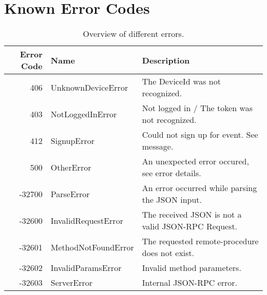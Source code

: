 \documentclass[a4paper]{scrreprt}
\begin{document}
\section{Known Error Codes}
\begin{table}[hb]
\centering
\begin{tabular}{| r | l | l |}
\hline
\textbf{Error Code} & \textbf{Name} & \textbf{Description} \\
\hline
406 & UnknownDeviceError & The DeviceId was not recognized.\\
403 & NotLoggedInError & Not logged in / The token was not recognized.\\
412 & SignupError & Could not sign up for event. See message.\\
\hline
500 & OtherError &An unexpected error occured, see error details. \\
-32700 & ParseError & An error occurred while parsing the JSON input.\\
-32600 & InvalidRequestError & The received JSON is not a valid JSON-RPC Request.\\
-32601 & MethodNotFoundError & The requested remote-procedure does not exist.\\
-32602 & InvalidParamsError & Invalid method parameters.\\
-32603 & ServerError& Internal JSON-RPC error.\\
\hline
\end{tabular}
\caption{Overview of different errors.}
\end{table}
\end{document}
